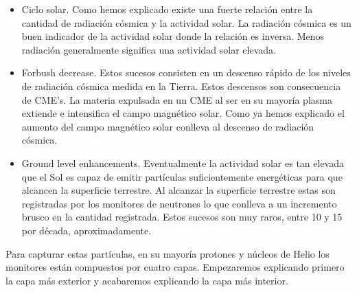 	\begin{itemize}
	  	\item	Ciclo solar. Como hemos explicado existe una fuerte relación entre la cantidad de radiación cósmica y la actividad solar. 
		  	La radiación cósmica es un buen indicador de la actividad solar donde la relación es inversa. Menos radiación generalmente
			significa una actividad solar elevada.	
		\item	Forbush decrease\cite{Forbush1938}. Estos sucesos consisten en un descenso rápido de los niveles de radiación cósmica medida
			en la Tierra. Estos descensos son consecuencia de CME's. La materia expulsada en un CME al ser en su mayoría plasma extiende e
			intensifica el 	campo magnético solar. Como ya hemos explicado el aumento del campo magnético solar conlleva al descenso de
			radiación cósmica. 
		\item	Ground level enhancements. Eventualmente la actividad solar es tan elevada que el Sol es capaz de emitir partículas
		  	suficientemente energéticas para que alcancen la superficie terrestre. Al alcanzar la superficie terrestre estas son 
			registradas por los monitores de neutrones lo que conlleva a un incremento brusco en la cantidad registrada. Estos sucesos
			son muy raros, entre 10 y 15 por década, aproximadamente.  
	\end{itemize}
	Para capturar estas partículas, en su mayoría protones y núcleos de Helio los monitores están compuestos por cuatro capas. Empezaremos 
	explicando primero la capa más exterior y acabaremos explicando la capa más interior.
